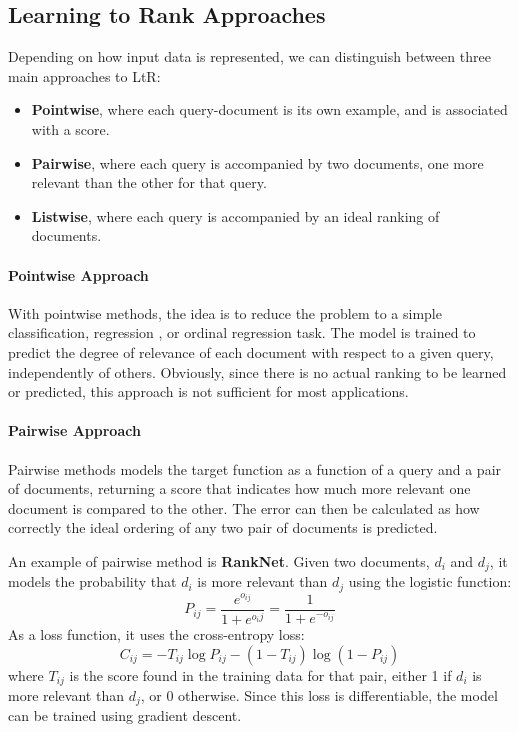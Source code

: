 \subsection{Learning to Rank Approaches}

Depending on how input data is represented, we can distinguish between three main approaches to LtR:
\begin{itemize}
    \item \textbf{Pointwise}, where each query-document is its own example, and is associated with a score.
    \item \textbf{Pairwise}, where each query is accompanied by two documents, one more relevant than the other for that query.
    \item \textbf{Listwise}, where each query is accompanied by an ideal ranking of documents.
\end{itemize}

\paragraph{Pointwise Approach}
With pointwise methods, the idea is to reduce the problem to a simple classification,  regression , or ordinal regression task. The model is trained to predict the degree of relevance of each document with respect to a given query, independently of others. Obviously, since there is no actual ranking to be learned or predicted, this approach is not sufficient for most applications.

\paragraph{Pairwise Approach}
Pairwise methods models the target function as a function of a query and a pair of documents, returning a score that indicates how much more relevant one document is compared to the other. The error can then be calculated as how correctly the ideal ordering of any two pair of documents is predicted.

An example of pairwise method is \textbf{RankNet}. Given two documents, $d_i$ and $d_j$, it models the probability that $d_i$ is more relevant than $d_j$ using the logistic function:
\begin{equation*}
    P_{ij} = \frac{e^{o_{ij}}}{1 + e^{o_ij}} = \frac{1}{1 + e^{-o_{ij}}}
\end{equation*}
As a loss function, it uses the cross-entropy loss:
\begin{equation*}
    C_{ij} = - T_{ij} \log P_{ij} - (1 - T_{ij}) \log (1 - P_{ij})
\end{equation*}
where $T_{ij}$ is the score found in the training data for that pair, either 1 if $d_i$ is more relevant than $d_j$, or 0 otherwise. Since this loss is differentiable, the model can be trained using gradient descent.

